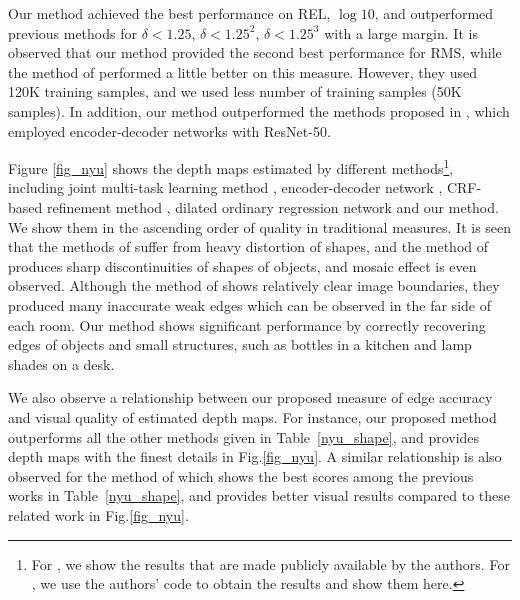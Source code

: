 \documentclass[10pt,twocolumn,letterpaper]{article}
\begin{document}
Our method achieved the best performance on REL, $\log10$, and outperformed previous methods for
$\delta<1.25$, $\delta<1.25^{2}$,  $\delta<1.25^{3}$ with a large margin.
It is observed that our method provided the second best performance for RMS, while the method of \cite{fu2018deep} performed a little better on this measure. However, they used 120K training samples, and we used less number of training samples (50K samples).
In addition, our method outperformed the methods proposed in \cite{laina2016deeper,ma2017sparse}, which employed encoder-decoder networks with ResNet-50. 

Figure \ref{fig_nyu} shows the depth maps estimated by different methods\footnote{For \cite{Eigen2015PredictingDS}, we show the results that are made publicly available by the authors. For \cite{laina2016deeper,Xu2017MultiscaleCC,fu2018deep}, we use the authors' code to obtain the results and show them here. }, including joint multi-task learning method \cite{Eigen2015PredictingDS}, encoder-decoder network \cite{laina2016deeper}, CRF-based refinement method \cite{Xu2017MultiscaleCC}, dilated ordinary regression network \cite{fu2018deep} and our method.
We show them in the ascending order of quality in traditional measures.
It is seen that the methods of \cite{laina2016deeper,Xu2017MultiscaleCC} suffer from heavy distortion of shapes, and the method of \cite{fu2018deep} produces sharp discontinuities of shapes of objects, and mosaic effect is even observed.
Although the method of \cite{Eigen2015PredictingDS} shows relatively clear image boundaries, they produced many inaccurate weak edges which can be observed in the far side of each room. 
Our method shows significant performance by correctly recovering edges of objects  and small structures, such as bottles in a kitchen and lamp shades on a desk.

We also observe a relationship between our proposed measure of edge accuracy   and visual quality of estimated depth maps. For instance, our proposed method outperforms all the other methods given in Table~\ref{nyu_shape}, and provides depth maps with the finest details in Fig.\ref{fig_nyu}. A similar relationship is also observed for the method of \cite{Eigen2015PredictingDS} which shows the best scores among the previous works in Table~\ref{nyu_shape}, and provides better visual results compared to these related work in Fig.\ref{fig_nyu}.   
\end{document}
